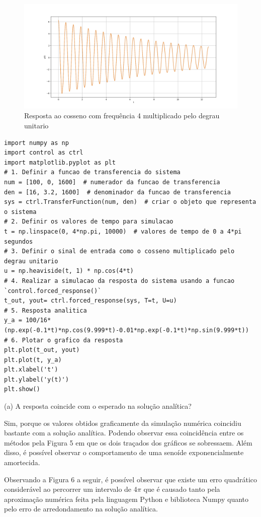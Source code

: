 \documentclass[10pt]{article}
\begin{document}
\begin{figure}[h]
    \centering
    \includegraphics[scale=0.4]{questao2.png}
    \caption{Resposta ao cosseno com frequência 4 multiplicado pelo degrau unitario}
\end{figure}


\begin{lstlisting}
import numpy as np
import control as ctrl
import matplotlib.pyplot as plt
# 1. Definir a funcao de transferencia do sistema
num = [100, 0, 1600]  # numerador da funcao de transferencia
den = [16, 3.2, 1600]  # denominador da funcao de transferencia
sys = ctrl.TransferFunction(num, den)  # criar o objeto que representa o sistema
# 2. Definir os valores de tempo para simulacao
t = np.linspace(0, 4*np.pi, 10000)  # valores de tempo de 0 a 4*pi segundos
# 3. Definir o sinal de entrada como o cosseno multiplicado pelo degrau unitario
u = np.heaviside(t, 1) * np.cos(4*t)
# 4. Realizar a simulacao da resposta do sistema usando a funcao `control.forced_response()`
t_out, yout= ctrl.forced_response(sys, T=t, U=u)
# 5. Resposta analitica
y_a = 100/16*(np.exp(-0.1*t)*np.cos(9.999*t)-0.01*np.exp(-0.1*t)*np.sin(9.999*t))
# 6. Plotar o grafico da resposta
plt.plot(t_out, yout)
plt.plot(t, y_a)
plt.xlabel('t')
plt.ylabel('y(t)')
plt.show()
\end{lstlisting}

(a) A resposta coincide com o esperado na solução analítica?

\quad Sim, porque os valores obtidos graficamente da simulação numérica coincidiu bastante com a solução analítica.
Podendo observar essa coincidência entre os métodos pela Figura 5 em que os dois traçados dos gráficos se sobressaem.
Além disso, é possível observar o comportamento de uma senoíde exponencialmente amortecida.

\quad Observando a Figura 6 a seguir, é possível observar que existe um erro quadrático considerável
ao percorrer um intervalo de 4$\pi$ que é causado tanto pela aproximação numérica feita pela linguagem Python e biblioteca Numpy
quanto pelo erro de arredondamento na solução analítica.
\end{document}
